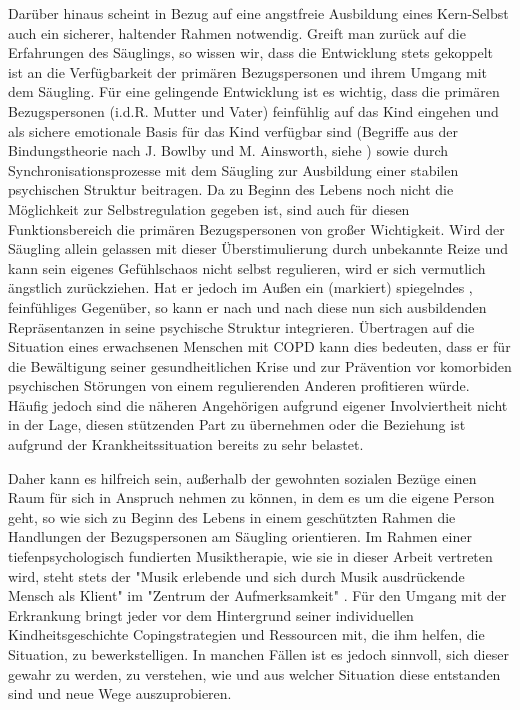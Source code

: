 Darüber hinaus scheint in Bezug auf eine angstfreie Ausbildung eines Kern-Selbst auch ein sicherer, haltender Rahmen notwendig. Greift man zurück auf die Erfahrungen des Säuglings, so wissen wir, dass die Entwicklung stets gekoppelt ist an die Verfügbarkeit der primären Bezugspersonen und ihrem Umgang mit dem Säugling. Für eine gelingende Entwicklung ist es wichtig, dass die primären Bezugspersonen (i.d.R. Mutter und Vater) feinfühlig auf das Kind eingehen und als sichere emotionale Basis für das Kind verfügbar sind (Begriffe aus der Bindungstheorie nach J. Bowlby und M. Ainsworth, siehe \cite{brisch2013}) sowie durch Synchronisationsprozesse mit dem Säugling zur Ausbildung einer stabilen psychischen Struktur beitragen. Da zu Beginn des Lebens noch nicht die Möglichkeit zur Selbstregulation gegeben ist, sind auch für diesen Funktionsbereich die primären Bezugspersonen von großer Wichtigkeit. Wird der Säugling allein gelassen mit dieser Überstimulierung durch unbekannte Reize und kann sein eigenes Gefühlschaos nicht selbst regulieren, wird er sich vermutlich ängstlich zurückziehen. Hat er jedoch im Außen ein (markiert) spiegelndes \autocite[vgl.][153]{fonagy2004}, feinfühliges Gegenüber, so kann er nach und nach diese nun sich ausbildenden Repräsentanzen in seine psychische Struktur integrieren. 
Übertragen auf die Situation eines erwachsenen Menschen mit COPD kann dies bedeuten, dass er für die Bewältigung seiner gesundheitlichen Krise und zur Prävention vor komorbiden psychischen Störungen von einem regulierenden Anderen profitieren würde. Häufig jedoch sind die näheren Angehörigen aufgrund eigener Involviertheit nicht in der Lage, diesen stützenden Part zu übernehmen oder die Beziehung ist aufgrund der Krankheitssituation bereits zu sehr belastet. 

Daher kann es hilfreich sein, außerhalb der gewohnten sozialen Bezüge einen Raum für sich in Anspruch nehmen zu können, in dem es um die eigene Person geht, so wie sich zu Beginn des Lebens in einem geschützten Rahmen die Handlungen der Bezugspersonen am Säugling orientieren. Im Rahmen einer tiefenpsychologisch fundierten Musiktherapie, wie sie in dieser Arbeit vertreten wird, steht stets der "Musik erlebende und sich durch Musik ausdrückende Mensch als Klient" im "Zentrum der Aufmerksamkeit" \autocite[4]{timmermann2004}. Für den Umgang mit der Erkrankung bringt jeder vor dem Hintergrund seiner individuellen Kindheitsgeschichte Copingstrategien und Ressourcen mit, die ihm helfen, die Situation, zu bewerkstelligen. In manchen Fällen ist es jedoch sinnvoll, sich dieser gewahr zu werden, zu verstehen, wie und aus welcher Situation diese entstanden sind und neue Wege auszuprobieren. 

